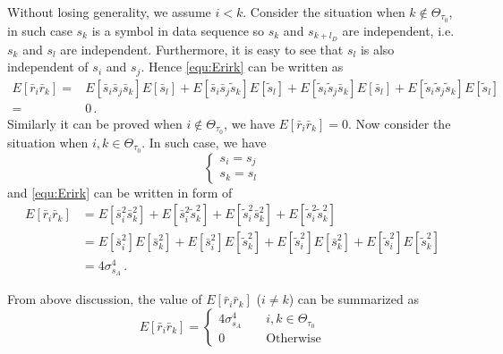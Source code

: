Without losing generality, we assume $i < k$. Consider the situation when $k \notin \Theta_{\tau_0}$, in such case $s_k$ is a symbol in data sequence so $s_k$ and $s_{k+l_D}$ are independent, i.e. $s_k$ and $s_l$ are independent. Furthermore, it is easy to see that $s_l$ is also independent of $s_i$ and $s_j$. Hence \eqref{equ:Erirk} can be written as
\begin{equation}
  \begin{split}
  E[\bar{r}_i\bar{r}_k] = &E[\bar{s}_i\bar{s}_j\bar{s}_k]E[\bar{s}_l] + E[\bar{s}_i\bar{s}_j\tilde{s}_k]E[\tilde{s}_l] + E[\tilde{s}_i\tilde{s}_j\bar{s}_k]E[\bar{s}_l] + E[\tilde{s}_i\tilde{s}_j\tilde{s}_k]E[\tilde{s}_l]\\
  = &0\,.
\end{split}
  \label{equ:Erirksitu1}
\end{equation} 
Similarly it can be proved when $i \notin \Theta_{\tau_0}$, we have $E[\bar{r}_i\bar{r}_k] =0$. Now consider the situation when $i, k \in \Theta_{\tau_0}$. In such case, we have 
\begin{equation}
  \begin{cases}
    s_i = s_j\\
    s_k = s_l
  \end{cases}
\end{equation}
and \eqref{equ:Erirk} can be written in form of
\begin{equation}
  \begin{split}
    E[\bar{r}_i\bar{r}_k] &= E[\bar{s}_i^2\bar{s}_k^2] + E[\bar{s}_i^2\tilde{s}_k^2]  +E[\tilde{s}_i^2\bar{s}_k^2] + E[\tilde{s}_i^2\tilde{s}_k^2] \\
    &= E[\bar{s}_i^2]E[\bar{s}_k^2] + E[\bar{s}_i^2]E[\tilde{s}_k^2]  +E[\tilde{s}_i^2]E[\bar{s}_k^2] + E[\tilde{s}_i^2]E[\tilde{s}_k^2] \\
    &= 4\sigma_{s_A}^4\,.
  \end{split}
  \label{Eririsitu2}
\end{equation}

From above discussion, the value of $E[\bar{r}_i\bar{r}_k]$  ($i \neq k$) can be summarized as
\begin{equation}
  E[\bar{r}_i\bar{r}_k] =  \begin{cases}
    4\sigma_{s_A}^4 \;\;\;\;&i, k \in \Theta_{\tau_0}\\
    0\;\;\;\;&\text{Otherwise}
  \end{cases}
  \label{Er_ir_j}
\end{equation}

